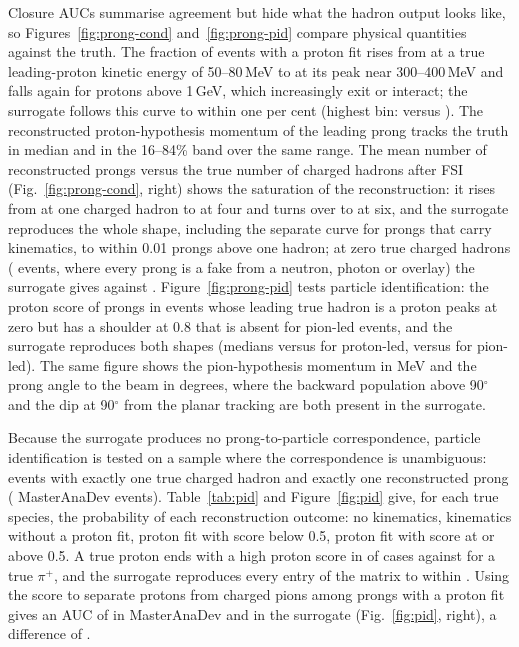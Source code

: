 \documentclass[11pt]{article}
\begin{document}
Closure AUCs summarise agreement but hide what the hadron output looks like, so Figures~\ref{fig:prong-cond}
and~\ref{fig:prong-pid} compare physical quantities against the truth. The fraction of events with a proton fit
rises from \nPfitLow{} at a true leading-proton kinetic energy of 50--80\,MeV to \nPfitPeak{} at its peak near 300--400\,MeV and falls again
for protons above 1\,GeV, which increasingly exit or interact; the surrogate follows this curve to within one
per cent (highest bin: \nPfitHiFake{} versus \nPfitHiReal{}). The reconstructed proton-hypothesis momentum of
the leading prong tracks the truth in median and in the 16--84\% band over the same range. The mean number of
reconstructed prongs versus the true number of charged hadrons after FSI (Fig.~\ref{fig:prong-cond}, right)
shows the saturation of the reconstruction: it rises from \nProngsOne{} at one charged hadron to \nProngsFour{} at four and turns
over to \nProngsSix{} at six, and the surrogate reproduces the whole shape, including the separate curve for prongs
that carry kinematics, to within 0.01 prongs above one hadron; at zero true charged hadrons (\nEventsZeroCh{} events,
where every prong is a fake from a neutron, photon or overlay) the surrogate gives \nProngsZeroFake{} against \nProngsZeroReal{}.
Figure~\ref{fig:prong-pid} tests particle identification: the proton score of prongs in events whose leading
true hadron is a proton peaks at zero but has a shoulder at 0.8 that is absent for pion-led events, and the
surrogate reproduces both shapes (medians \nScoreMedPReal{} versus \nScoreMedPFake{} for proton-led, \nScoreMedPiReal{} versus
\nScoreMedPiFake{} for pion-led). The same figure shows the pion-hypothesis momentum in MeV and the prong angle to the
beam in degrees, where the backward population above 90$^\circ$ and the dip at 90$^\circ$ from the planar
tracking are both present in the surrogate.

Because the surrogate produces no prong-to-particle correspondence, particle identification is tested on a
sample where the correspondence is unambiguous: events with exactly one true charged hadron and exactly one
reconstructed prong (\nPIDevents{} MasterAnaDev events). Table~\ref{tab:pid} and
Figure~\ref{fig:pid} give, for each true species, the probability of each reconstruction outcome: no kinematics,
kinematics without a proton fit, proton fit with score below 0.5, proton fit with score at or above 0.5. A true
proton ends with a high proton score in \nPIDprotonHigh{} of cases against \nPIDpionHigh{} for a true $\pi^+$, and the surrogate
reproduces every entry of the matrix to within \nPIDmaxDiff{}. Using the score to separate protons from charged
pions among prongs with a proton fit gives an AUC of \nPIDaucReal{} in MasterAnaDev and \nPIDaucFake{} in the
surrogate (Fig.~\ref{fig:pid}, right), a difference of \nPIDaucGap{}.
\end{document}
